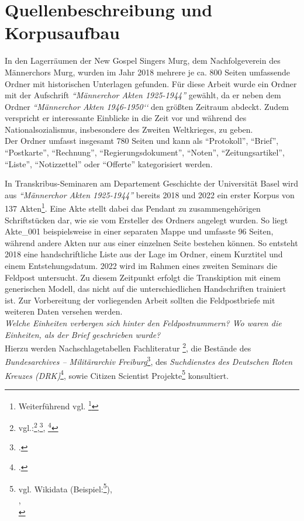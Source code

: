 \documentclass[12pt, a4paper, ngerman, bidi=default]{article}
\renewcommand{\cite}{\footcite}
\begin{document}
\section{Quellenbeschreibung und Korpusaufbau}
In den Lagerräumen der New Gospel Singers Murg, dem Nachfolgeverein des Männerchors Murg, 
wurden im Jahr 2018 mehrere je ca. 800 Seiten umfassende Ordner mit historischen Unterlagen gefunden. 
Für diese Arbeit wurde ein Ordner mit der Aufschrift \textit{``Männerchor Akten 1925-1944''} gewählt, da er neben dem Ordner 
\textit{``Männerchor Akten 1946-1950‘‘} den größten Zeitraum abdeckt. Zudem verspricht er interessante Einblicke 
in die Zeit vor und während des Nationalsozialismus, insbesondere des Zweiten Weltkrieges, zu geben.\\ 
Der Ordner umfasst insgesamt 780 Seiten und kann als ``Protokoll'', ``Brief'', ``Postkarte'', ``Rechnung'', ``Regierungsdokument'', ``Noten'', ``Zeitungsartikel'', ``Liste'', ``Notizzettel'' oder ``Offerte'' kategorisiert werden.







In Transkribus-Seminaren am Departement Geschichte der Universität Basel wird aus \textit{``Männerchor Akten 1925-1944''} bereits 2018 und 2022 ein 
erster Korpus von 137 Akten\footnote{Weiterführend vgl. \cite{burkhardt_arcgis_2022}}. Eine Akte stellt dabei das Pendant zu zusammengehörigen Schriftstücken dar, wie sie
vom Ersteller des Ordners angelegt wurden. So liegt Akte\_001 beispielsweise in einer separaten Mappe und umfasste 96 Seiten, 
während andere Akten nur aus einer einzelnen Seite bestehen können. So entsteht 2018 eine handschriftliche Liste aus der Lage im Ordner, 
einem Kurztitel und einem Entstehungsdatum. 2022 wird im Rahmen eines zweiten Seminars die Feldpost untersucht.
Zu diesem Zeitpunkt erfolgt die Transkiption mit einem generischen Modell, das nicht auf die unterschiedlichen Handschriften trainiert 
ist.
Zur Vorbereitung der vorliegenden Arbeit sollten die Feldpostbriefe mit weiteren Daten versehen werden.\\ \textit{Welche Einheiten 
verbergen sich hinter den Feldpostnummern? Wo waren die Einheiten, als der Brief geschrieben wurde?}\\
Hierzu werden Nachschlagetabellen Fachliteratur \footnote{vgl.:\cite{tessin_verbande_1977},\cite{hartmann_wehrmacht_2010}, \cite{rass_deutsche_2009}},
die Bestände des \textit{Bundesarchives -- Militärarchiv Freiburg}\cite{hollmann_freiburg_2025}, 
des \textit{Suchdienstes des Deutschen Roten Kreuzes (DRK)}\cite{reuter_drk_2025}, sowie Citizen Scientist Projekte\footnote{vgl. 
Wikidata (Beispiel:\cite{burkhardt_78th_2024}),\\\indent{\cite{altenburger_lexikon_nodate-1}},\\\indent{\cite{hermans_forum_nodate}}} konsultiert.
\end{document}
